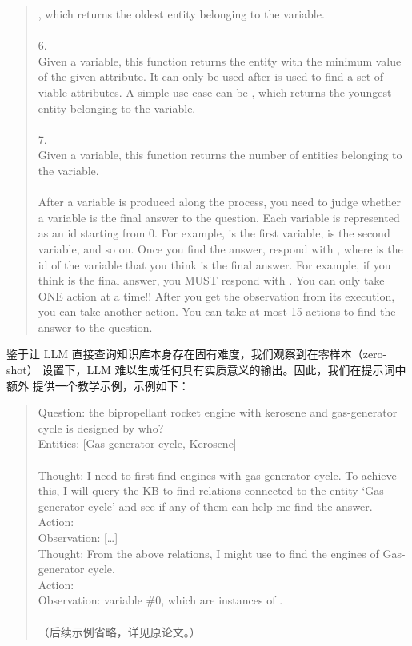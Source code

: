 \begin{quote}
, which returns the oldest entity belonging
to the variable.\\
\\
6. \\
Given a variable, this function returns the entity with the minimum value
of the given attribute. It can only be used after 
is used to find a set of viable attributes. A simple use case can be
, which returns the youngest entity belonging
to the variable.\\
\\
7. \\
Given a variable, this function returns the number of entities belonging
to the variable.\\
\\
After a variable is produced along the process, you need to judge whether
a variable is the final answer to the question. Each variable is
represented as an id starting from 0. For example,  is the first
variable,  is the second variable, and so on. Once you find the
answer, respond with , where  is the
id of the variable that you think is the final answer. For example, if
you think  is the final answer, you MUST respond with
. You can only take ONE action at a time!! After
you get the observation from its execution, you can take another action.
You can take at most 15 actions to find the answer to the question.
\end{quote}

鉴于让 LLM 直接查询知识库本身存在固有难度，我们观察到在零样本（zero-shot）
设置下，LLM 难以生成任何具有实质意义的输出。因此，我们在提示词中额外
提供一个教学示例，示例如下：

\begin{quote}\small\ttfamily
Question: the bipropellant rocket engine with kerosene and gas-generator
cycle is designed by who?\\
Entities: [Gas-generator cycle, Kerosene]\\
\\
Thought: I need to first find engines with gas-generator cycle. To achieve
this, I will query the KB to find relations connected to the entity
`Gas-generator cycle' and see if any of them can help me find the answer.\\
Action: \\
Observation: [\dots]\\
Thought: From the above relations, I might use
 to find the engines
of Gas-generator cycle.\\
Action: \\
Observation: variable \#0, which are instances of
.\\
\\
（后续示例省略，详见原论文。）
\end{quote}
